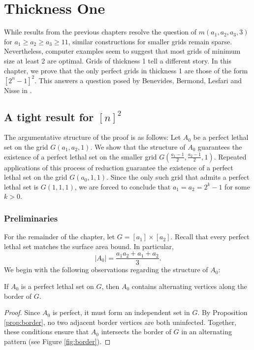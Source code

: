\chapter{Thickness One}

While results from the previous chapters resolve the question of $m(a_1,a_2,a_3,3)$ for $a_1 \geq a_2 \geq a_3 \geq 11$, similar constructions for smaller grids remain sparse. Nevertheless, computer examples seem to suggest that most grids of minimum size at least 2 are optimal. Grids of thickness 1 tell a different story. In this chapter, we prove that the only perfect grids in thickness 1 are those of the form $[2^n-1]^2$. This answers a question posed by Benevides, Bermond, Lesfari and Nisse in \cite{benevides:2021}.

\section{A tight result for $[n]^2$}
The argumentative structure of the proof is as follows: Let $A_0$ be a perfect lethal set on the grid $G(a_1, a_2, 1)$. We show that the structure of $A_0$ guarantees the existence of a perfect lethal set on the smaller grid $G(\frac{a_1-1}{2}, \frac{a_2-1}{2}, 1)$. Repeated applications of this process of reduction guarantee the existence of a perfect lethal set on the grid $G(a_0, 1,1)$. Since the only such grid that admits a perfect lethal set is $G(1,1,1)$, we are forced to conclude that $a_1 = a_2 = 2^k-1$ for some $k > 0$. 

\subsection{Preliminaries}
For the remainder of the chapter, let $G = [a_1] \times [a_2]$. Recall that every perfect lethal set matches the surface area bound. In particular,
$$|A_0| = \frac{a_1a_2 + a_1 + a_2}{3}.$$
We begin with the following observations regarding the structure of $A_0$:

\begin{prop}
\label{prop:alternating_border}
If $A_0$ is a perfect lethal set on $G$, then $A_0$ contains alternating vertices along the border of $G$. 
\end{prop}

\begin{proof}
Since $A_0$ is perfect, it must form an independent set in $G$. By Proposition \ref{prop:border}, no two adjacent border vertices are both uninfected. Together, these conditions ensure that $A_0$ intersects the border of $G$ in an alternating pattern (see Figure \ref{fig:border}). 
\end{proof}

